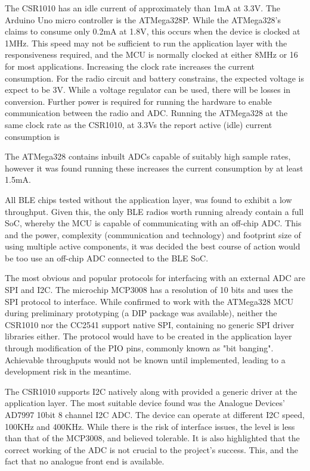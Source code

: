 \documentclass[]{article}
\begin{document}
The CSR1010 has an idle current of approximately than 1mA at 3.3V. The Arduino Uno micro controller is the ATMega328P. While the ATMega328's claims to consume only 0.2mA at 1.8V, this occurs when the device is clocked at 1MHz. This speed may not be sufficient to run the application layer with the responsiveness required, and the \ac{MCU} is normally clocked at either 8MHz or 16 for most applications. Increasing the clock rate increases the current consumption. For the radio circuit and battery constrains, the expected voltage is expect to be 3V. While a voltage regulator can be used, there will be losses in conversion.   Further power is required for running the hardware to enable communication between the radio and ADC. Running the ATMega328 at the same clock rate as the CSR1010, at 3.3Vs the report active (idle) current consumption is 

The ATMega328 contains inbuilt \ac{ADC}s capable of suitably high sample rates, however it was found running these increases the current consumption by at least 1.5mA. 

All \ac{BLE} chips tested without the application layer, was found to exhibit a low throughput. Given this, the only \ac{BLE} radios worth running already contain a full \ac{SoC}, whereby the \ac{MCU} is capable of communicating with an off-chip \ac{ADC}. This and the power, complexity (communication and technology) and footprint size of using multiple active components, it was decided the best course of action would be too use an off-chip ADC connected to the \ac{BLE} \ac{SoC}. 

The most obvious and popular protocols for interfacing with an external \ac{ADC} are \ac{SPI} and I2C. The microchip MCP3008 has a resolution of 10 bits and uses the \ac{SPI} protocol to interface. While confirmed to work with the ATMega328 MCU during preliminary prototyping (a \ac{DIP} package was available),  neither the CSR1010 nor the CC2541 support native SPI, containing no generic SPI driver libraries either. The protocol would have to be created in the application layer through modification of the \ac{PIO} pins, commonly known as "bit banging". Achievable throughputs would not be known until implemented, leading to a development risk in the meantime. 

The CSR1010 supports I2C natively along with provided a generic driver at the application layer. The most suitable device found was the Analogue Devices' AD7997 10bit 8 channel I2C ADC. The device can operate at different I2C speed, 100KHz and 400KHz. While there is the risk of interface issues, the level is less than that of the MCP3008, and believed tolerable. It is also highlighted that the correct working of the \ac{ADC} is not crucial to the project's success. This, and the fact that no analogue front end is available. 
\end{document}
